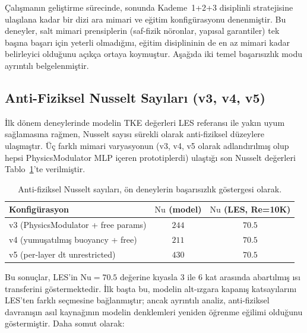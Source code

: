Çalışmanın geliştirme sürecinde, sonunda Kademe~1+2+3 disiplinli stratejisine ulaşılana kadar bir dizi ara mimari ve eğitim konfigürasyonu denenmiştir. Bu deneyler, salt mimari prensiplerin (saf-fizik nöronlar, yapısal garantiler) tek başına başarı için yeterli olmadığını, eğitim disiplininin de en az mimari kadar belirleyici olduğunu açıkça ortaya koymuştur. Aşağıda iki temel başarısızlık modu ayrıntılı belgelenmiştir.

\subsection{Anti-Fiziksel Nusselt Sayıları (v3, v4, v5)}

İlk dönem deneylerinde modelin TKE değerleri LES referansı ile yakın uyum sağlamasına rağmen, Nusselt sayısı sürekli olarak anti-fiziksel düzeylere ulaşmıştır. Üç farklı mimari varyasyonun (v3, v4, v5 olarak adlandırılmış olup hepsi PhysicsModulator MLP içeren prototiplerdi) ulaştığı son Nusselt değerleri Tablo~\ref{tab:antifizik_v3v4v5}'te verilmiştir.

\begin{table}[H]
\centering
\caption{Anti-fiziksel Nusselt sayıları, ön deneylerin başarısızlık göstergesi olarak.}
\label{tab:antifizik_v3v4v5}
\begin{tabular}{lcc}
\toprule
\textbf{Konfigürasyon} & \textbf{$\mathrm{Nu}$ (model)} & \textbf{$\mathrm{Nu}$ (LES, Re=10K)} \\
\midrule
v3 (PhysicsModulator + free params)   & $244$ & $70.5$ \\
v4 (yumuşatılmış buoyancy + free)     & $211$ & $70.5$ \\
v5 (per-layer dt unrestricted)         & $430$ & $70.5$ \\
\bottomrule
\end{tabular}
\end{table}

Bu sonuçlar, LES'in $\mathrm{Nu}=70.5$ değerine kıyasla 3 ile 6 kat arasında abartılmış ısı transferini göstermektedir. İlk başta bu, modelin alt-ızgara kapanış katsayılarını LES'ten farklı seçmesine bağlanmıştır; ancak ayrıntılı analiz, anti-fiziksel davranışın asıl kaynağının modelin denklemleri yeniden öğrenme eğilimi olduğunu göstermiştir. Daha somut olarak:

